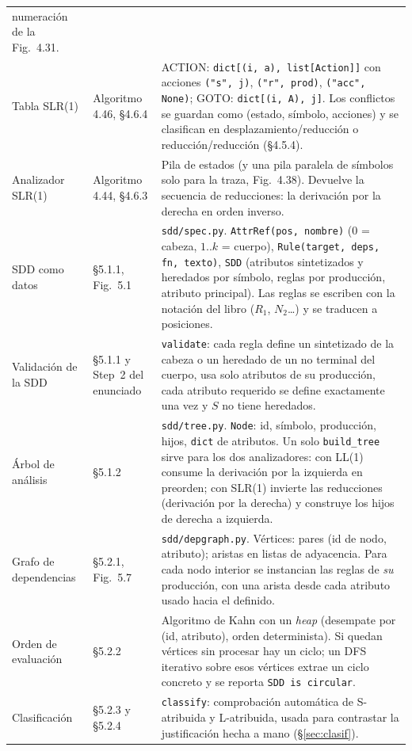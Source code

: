 \documentclass[11pt,a4paper]{article}
\newcommand{\code}[1]{\texttt{#1}}
\begin{document}
\begin{longtable}{>{\raggedright}p{3.2cm} >{\raggedright}p{4.6cm} p{6.6cm}}
numeración de la Fig.~4.31.\\
Tabla SLR(1) & Algoritmo 4.46, §4.6.4 &
ACTION: \code{dict[(i, a), list[Action]]} con acciones \code{("s", j)}, \code{("r", prod)},
\code{("acc", None)}; GOTO: \code{dict[(i, A), j]}. Los conflictos se guardan como
(estado, símbolo, acciones) y se clasifican en desplazamiento/reducción o reducción/reducción
(§4.5.4).\\
Analizador SLR(1) & Algoritmo 4.44, §4.6.3 &
Pila de estados (y una pila paralela de símbolos solo para la traza, Fig.~4.38). Devuelve la
secuencia de reducciones: la derivación por la derecha en orden inverso.\\
SDD como datos & §5.1.1, Fig.~5.1 &
\code{sdd/spec.py}. \code{AttrRef(pos, nombre)} (0 = cabeza, $1..k$ = cuerpo),
\code{Rule(target, deps, fn, texto)}, \code{SDD} (atributos sintetizados y heredados por
símbolo, reglas por producción, atributo principal). Las reglas se escriben con la notación del
libro ($R_1$, $N_2$\dots) y se traducen a posiciones.\\
Validación de la SDD & §5.1.1 y Step~2 del enunciado &
\code{validate}: cada regla define un sintetizado de la cabeza o un heredado de un no terminal del
cuerpo, usa solo atributos de su producción, cada atributo requerido se define exactamente una
vez y $S$ no tiene heredados.\\
Árbol de análisis & §5.1.2 &
\code{sdd/tree.py}. \code{Node}: id, símbolo, producción, hijos, \code{dict} de atributos. Un
solo \code{build\_tree} sirve para los dos analizadores: con LL(1) consume la derivación por la
izquierda en preorden; con SLR(1) invierte las reducciones (derivación por la derecha) y
construye los hijos de derecha a izquierda.\\
Grafo de dependencias & §5.2.1, Fig.~5.7 &
\code{sdd/depgraph.py}. Vértices: pares (id de nodo, atributo); aristas en listas de
adyacencia. Para cada nodo interior se instancian las reglas de \emph{su} producción, con una
arista desde cada atributo usado hacia el definido.\\
Orden de evaluación & §5.2.2 &
Algoritmo de Kahn con un \emph{heap} (desempate por (id, atributo), orden determinista). Si
quedan vértices sin procesar hay un ciclo; un DFS iterativo sobre esos vértices extrae un ciclo
concreto y se reporta \code{SDD is circular}.\\
Clasificación & §5.2.3 y §5.2.4 &
\code{classify}: comprobación automática de S-atribuida y L-atribuida, usada para contrastar la
justificación hecha a mano (§\ref{sec:clasif}).\\
\bottomrule
\end{longtable}
\end{document}
